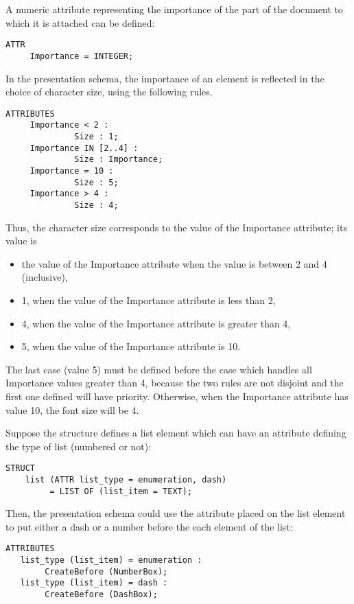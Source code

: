 \begin{example}
A numeric attribute representing the importance of the part of the
document to which it is attached can be defined:
\begin{verbatim}
ATTR
     Importance = INTEGER;
\end{verbatim}
In the presentation schema, the importance of an element is reflected
in the choice of character size, using the following rules.

\begin{verbatim}
ATTRIBUTES
     Importance < 2 :
              Size : 1;
     Importance IN [2..4] :
              Size : Importance;
     Importance = 10 :
              Size : 5;
     Importance > 4 :
              Size : 4;
\end{verbatim}
Thus, the character size corresponds to the value of the Importance
attribute; its value is

\begin{itemize}
  \item the value of the Importance attribute when the value is
between 2 and 4 (inclusive), 

  \item 1, when the value of the Importance attribute is less than 2,

  \item 4, when the value of the Importance attribute is greater than
4,

  \item 5, when the value of the Importance attribute is 10.
\end{itemize} 
The last case (value 5) must be defined before the case which handles
all Importance values greater than 4, because the two rules are not
disjoint and the first one defined will have priority.  Otherwise,
when the Importance attribute has value 10, the font size will be 4.
\end{example}

\begin{example}
Suppose the structure defines a list element which can have an
attribute defining the type of list (numbered or not):
\begin{verbatim}
STRUCT
    list (ATTR list_type = enumeration, dash)
         = LIST OF (list_item = TEXT);
\end{verbatim}
Then, the presentation schema could use the attribute placed on the
list element to put either a dash or a number before the each element
of the list:
\begin{verbatim}
ATTRIBUTES
   list_type (list_item) = enumeration :
        CreateBefore (NumberBox);
   list_type (list_item) = dash :
        CreateBefore (DashBox);
\end{verbatim}
\end{example}

